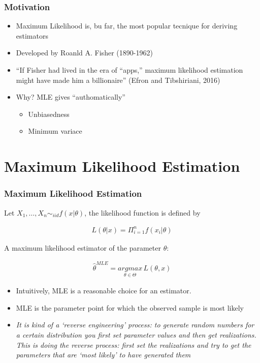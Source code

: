 \documentclass[
  shownotes,
  xcolor={svgnames},
  hyperref={colorlinks,citecolor=DarkBlue,linkcolor=DarkRed,urlcolor=DarkBlue}
  ]{beamer}
\begin{document}
\begin{frame}[fragile]
\frametitle{Motivation}

\begin{itemize}
    \item Maximum Likelihood is, bu far, the most popular tecnique for deriving estimators
    \bigskip 
    \item Developed by Roanld A. Fisher (1890-1962)
    \bigskip
    \item ``If Fisher had lived in the era of “apps,” maximum likelihood estimation might have made him a billionaire'' (Efron and Tibshiriani, 2016)
    \bigskip
    \item  Why? MLE gives ``authomatically''
    \begin{itemize}
      \item Unbiasedness 
      \medskip
      \item Minimum variace
    \end{itemize} 
\end{itemize}
 


 \end{frame}
\section{Maximum Likelihood Estimation}
\begin{frame}[fragile]
\frametitle{Maximum Likelihood Estimation}

Let $X_1,\dots,X_n\sim_{iid}f(x|\theta)$, the likelihood function is defined by

\begin{align}\label{eq:1}
L(\theta|x)=\Pi_{i=1}^n f(x_i|\theta)
\end{align}

A maximum likelihood estimator of the parameter $\theta$:

\begin{align}
\hat \theta^{MLE}=\underset{\theta \in \Theta}{argmax}\, L(\theta,x)
\end{align}

\begin{itemize}
  \item Intuitively, MLE is a reasonable choice for an estimator.
  \item MLE is the parameter point for which the observed sample is most likely
  \item {\it It is kind of a ‘reverse engineering’ process:  to generate random numbers for a certain distribution you first set parameter values and then get realizations. This is doing the reverse process:  first set the realizations and try to get the parameters that are ‘most likely’ to have generated them}
\end{itemize}


 \end{frame}
\end{document}
